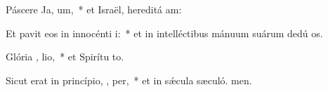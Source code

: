 \item Páscere Ja,  um,~* et Israël, hereditá am:
\item Et pavit eos in innocénti  i:~* et in intelléctibus mánuum suárum dedú os.
\item Glória ,  lio,~* et Spirítu to.
\item Sicut erat in princípio,  ,  per,~* et in sǽcula sæculó. men.
